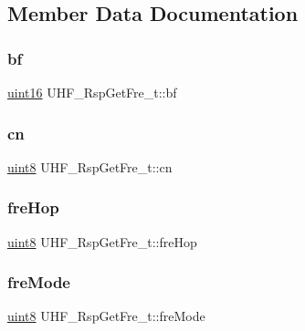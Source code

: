 \subsection{Member Data Documentation}
\mbox{\label{struct_u_h_f___rsp_get_fre__t_ad1a35e89b9034cdbc97dbbd372fe2eea}} 
\subsubsection{\texorpdfstring{bf}{bf}}
{\footnotesize\ttfamily \mbox{\hyperlink{m900dll_8h_a05f6b0ae8f6a6e135b0e290c25fe0e4e}{uint16}} U\+H\+F\+\_\+\+Rsp\+Get\+Fre\+\_\+t\+::bf}

\mbox{\label{struct_u_h_f___rsp_get_fre__t_a01465d835c226efbd4a38570ead81f3b}} 
\subsubsection{\texorpdfstring{cn}{cn}}
{\footnotesize\ttfamily \mbox{\hyperlink{m900dll_8h_adde6aaee8457bee49c2a92621fe22b79}{uint8}} U\+H\+F\+\_\+\+Rsp\+Get\+Fre\+\_\+t\+::cn}

\mbox{\label{struct_u_h_f___rsp_get_fre__t_a3c30e17801134c4064fc3347afaab21a}} 
\subsubsection{\texorpdfstring{freHop}{freHop}}
{\footnotesize\ttfamily \mbox{\hyperlink{m900dll_8h_adde6aaee8457bee49c2a92621fe22b79}{uint8}} U\+H\+F\+\_\+\+Rsp\+Get\+Fre\+\_\+t\+::fre\+Hop}

\mbox{\label{struct_u_h_f___rsp_get_fre__t_ad1b6bdceca1dd4b75a5bafc0edc90889}} 
\subsubsection{\texorpdfstring{freMode}{freMode}}
{\footnotesize\ttfamily \mbox{\hyperlink{m900dll_8h_adde6aaee8457bee49c2a92621fe22b79}{uint8}} U\+H\+F\+\_\+\+Rsp\+Get\+Fre\+\_\+t\+::fre\+Mode}

